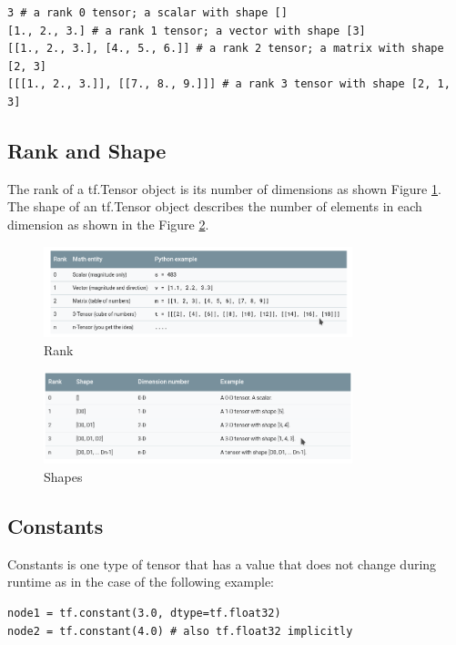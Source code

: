 \documentclass[11pt, fleqn]{article}
\begin{document}
\begin{verbatim}
3 # a rank 0 tensor; a scalar with shape []
[1., 2., 3.] # a rank 1 tensor; a vector with shape [3]
[[1., 2., 3.], [4., 5., 6.]] # a rank 2 tensor; a matrix with shape [2, 3]
[[[1., 2., 3.]], [[7., 8., 9.]]] # a rank 3 tensor with shape [2, 1, 3]
\end{verbatim}

\subsection{Rank and Shape}
The rank of a tf.Tensor object is its number of dimensions as shown Figure \ref{fig:rank}.  The shape of an tf.Tensor object describes the number of elements in each dimension as shown in the Figure \ref{fig:shape}.

\begin{figure}[h]
    \centering
    \includegraphics[width=0.8\textwidth]{img/rank.png}
    \caption{Rank}
    \label{fig:rank}
\end{figure}

\begin{figure}[h]
    \centering
    \includegraphics[width=0.8\textwidth]{img/shape.png}
    \caption{Shapes}
    \label{fig:shape}
\end{figure}


\subsection{Constants}
Constants is one type of tensor that has a value that does not change during runtime as in the case of the following example:

\begin{verbatim}
node1 = tf.constant(3.0, dtype=tf.float32)
node2 = tf.constant(4.0) # also tf.float32 implicitly
\end{verbatim}
\end{document}
